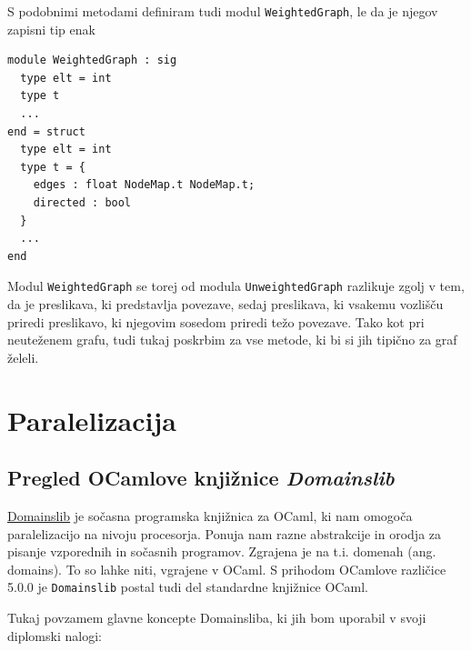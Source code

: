 \documentclass[mat1, tisk]{fmfdelo}
\begin{document}
S podobnimi metodami definiram tudi modul \texttt{WeightedGraph}, le da je njegov zapisni
tip enak
\begin{lstlisting}
module WeightedGraph : sig
  type elt = int
  type t
  ...
end = struct
  type elt = int
  type t = {
    edges : float NodeMap.t NodeMap.t; 
    directed : bool
  }
  ...
end
\end{lstlisting}

Modul \texttt{WeightedGraph} se torej od modula \texttt{UnweightedGraph} razlikuje zgolj v tem, da je preslikava, ki
predstavlja povezave, sedaj preslikava, ki vsakemu vozlišču priredi preslikavo, ki njegovim sosedom priredi težo povezave.
Tako kot pri neuteženem grafu, tudi tukaj poskrbim za vse metode, ki bi si jih tipično za graf želeli.

\section{Paralelizacija}

\subsection{Pregled OCamlove knjižnice \textit{Domainslib}} \label{sec:pregled_domainslib}

\href{https://github.com/ocaml-multicore/domainslib}{Domainslib} je sočasna programska knjižnica za OCaml, 
ki nam omogoča paralelizacijo na nivoju procesorja. Ponuja nam razne abstrakcije in orodja za pisanje vzporednih
in sočasnih programov. Zgrajena je na t.i. domenah (ang. domains). To so lahke niti, vgrajene v OCaml.
S prihodom OCamlove različice 5.0.0 je \texttt{Domainslib} postal tudi del standardne knjižnice OCaml.

Tukaj povzamem glavne koncepte Domainsliba, ki jih bom uporabil v svoji diplomski nalogi:
\end{document}
